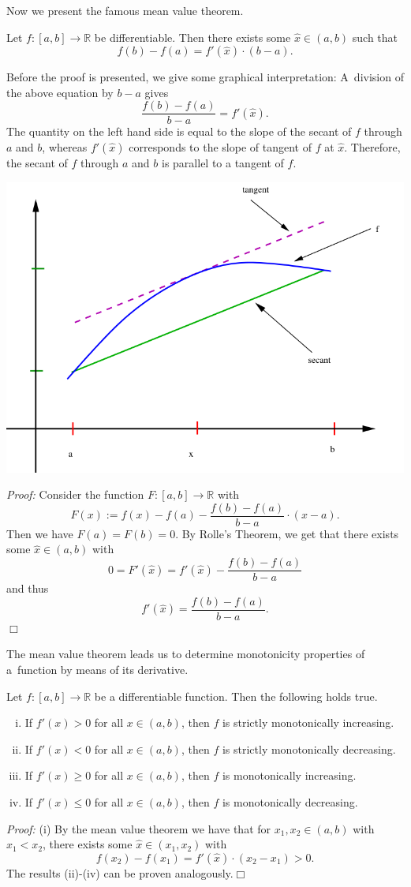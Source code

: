 

Now we present the famous mean value theorem.
\begin{Theorem}{}
Let $f:[a,b]\to\mathbb{R}$ be differentiable. Then there exists some $\hat{x}\in(a,b)$ such that
\[f(b)-f(a)=f'(\hat{x})\cdot (b-a).\]
\end{Theorem}
Before the proof is presented, we give some graphical interpretation: A~division of the above equation by $b-a$ gives
\[\frac{f(b)-f(a)}{b-a}=f'(\hat{x}).\]
The quantity on the left hand side is equal to the slope of the secant of $f$ through $a$ and $b$, whereas $f'(\hat{x})$ corresponds to the slope of tangent of $f$ at $\hat{x}$. Therefore,
the secant of $f$ through $a$ and $b$ is parallel to a tangent of $f$.

\includegraphics{./mean.png}

{\em Proof:} Consider the function $F:[a,b]\to\mathbb{R}$ with
\[F(x):=f(x)-f(a)-\frac{f(b)-f(a)}{b-a}\cdot(x-a).\]
Then we have $F(a)=F(b)=0$. By Rolle's Theorem, we get that there exists some $\hat{x}\in(a,b)$ with
\[0=F'(\hat{x})=f'(\hat{x})-\frac{f(b)-f(a)}{b-a}\]
and thus
\[f'(\hat{x})=\frac{f(b)-f(a)}{b-a}.\]
\hfill$\Box$

The mean value theorem leads us to determine monotonicity properties of a~function by means of its derivative.
\begin{Theorem}{}
    Let $f:[a,b]\to\mathbb{R}$ be a differentiable function. Then the following holds true.
\begin{enumerate}[(i)]
 \item If $f'(x)>0$ for all $x\in(a,b)$, then $f$ is strictly monotonically increasing.
 \item If $f'(x)<0$ for all $x\in(a,b)$, then $f$ is strictly monotonically decreasing.
 \item If $f'(x)\geq0$ for all $x\in(a,b)$, then $f$ is monotonically increasing.
 \item If $f'(x)\leq0$ for all $x\in(a,b)$, then $f$ is monotonically decreasing.
\end{enumerate}
\end{Theorem}
{\em Proof:}
(i) By the mean value theorem we have that for $x_1,x_2\in(a,b)$ with $x_1<x_2$, there exists some $\hat{x}\in(x_1,x_2)$ with
\[f(x_2)-f(x_1)=f'(\hat{x})\cdot(x_2-x_1)>0.\]
The results (ii)-(iv) can be proven analogously.\hfill$\Box$

